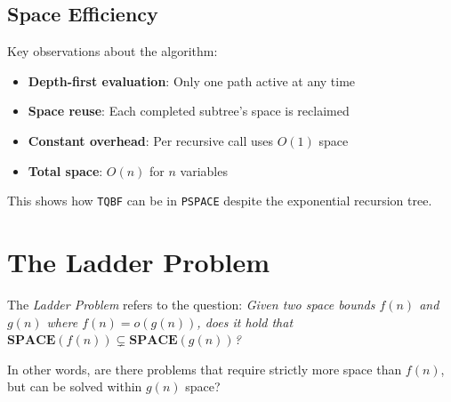 \begin{center}
\end{center}

\subsection{Space Efficiency}

Key observations about the algorithm:
\begin{itemize}
    \item \textbf{Depth-first evaluation}: Only one path active at any time
    \item \textbf{Space reuse}: Each completed subtree's space is reclaimed
    \item \textbf{Constant overhead}: Per recursive call uses $O(1)$ space
    \item \textbf{Total space}: $O(n)$ for $n$ variables
\end{itemize}

This shows how \texttt{TQBF} can be in \texttt{PSPACE} despite the exponential recursion tree.

    
\section{The Ladder Problem}

\begin{definition}
The \emph{Ladder Problem} refers to the question: \emph{Given two space bounds $f(n)$ and $g(n)$ where $f(n) = o(g(n))$, does it hold that $\mathbf{SPACE}(f(n)) \subsetneq \mathbf{SPACE}(g(n))$?}

In other words, are there problems that require strictly more space than $f(n)$, but can be solved within $g(n)$ space?
\end{definition}

